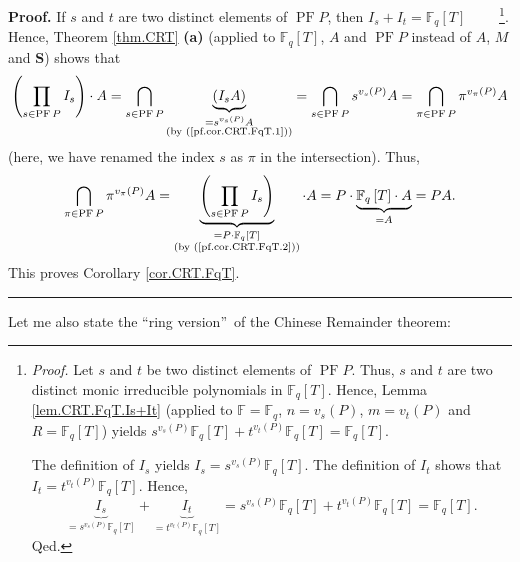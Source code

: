 \documentclass[numbers=enddot,12pt,final,onecolumn,notitlepage]{scrartcl}%
\theoremstyle{definition}
\newenvironment{proof}[1][Proof]{\noindent\textbf{#1.} }{\ \rule{0.5em}{0.5em}}
\let\prodnonlimits\prod
\renewcommand{\prod}{\prodnonlimits\limits}
\begin{document}
\begin{proof}
If $s$ and $t$ are two distinct elements of $\operatorname*{PF}P$, then
$I_{s}+I_{t}=\mathbb{F}_{q}\left[  T\right]  $%
\ \ \ \ \footnote{\textit{Proof.} Let $s$ and $t$ be two distinct elements of
$\operatorname*{PF}P$. Thus, $s$ and $t$ are two distinct monic irreducible
polynomials in $\mathbb{F}_{q}\left[  T\right]  $. Hence, Lemma
\ref{lem.CRT.FqT.Is+It} (applied to $\mathbb{F}=\mathbb{F}_{q}$,
$n=v_{s}\left(  P\right)  $, $m=v_{t}\left(  P\right)  $ and $R=\mathbb{F}%
_{q}\left[  T\right]  $) yields $s^{v_{s}\left(  P\right)  }\mathbb{F}%
_{q}\left[  T\right]  +t^{v_{t}\left(  P\right)  }\mathbb{F}_{q}\left[
T\right]  =\mathbb{F}_{q}\left[  T\right]  $.
\par
The definition of $I_{s}$ yields $I_{s}=s^{v_{s}\left(  P\right)  }%
\mathbb{F}_{q}\left[  T\right]  $. The definition of $I_{t}$ shows that
$I_{t}=t^{v_{t}\left(  P\right)  }\mathbb{F}_{q}\left[  T\right]  $. Hence,%
\[
\underbrace{I_{s}}_{=s^{v_{s}\left(  P\right)  }\mathbb{F}_{q}\left[
T\right]  }+\underbrace{I_{t}}_{=t^{v_{t}\left(  P\right)  }\mathbb{F}%
_{q}\left[  T\right]  }=s^{v_{s}\left(  P\right)  }\mathbb{F}_{q}\left[
T\right]  +t^{v_{t}\left(  P\right)  }\mathbb{F}_{q}\left[  T\right]
=\mathbb{F}_{q}\left[  T\right]  .
\]
Qed.}. Hence, Theorem \ref{thm.CRT} \textbf{(a)} (applied to $\mathbb{F}%
_{q}\left[  T\right]  $, $A$ and $\operatorname*{PF}P$ instead of $A$, $M$ and
$\mathbf{S}$) shows that%
\[
\left(  \prod\limits_{s\in\operatorname*{PF}P}I_{s}\right)  \cdot
A=\bigcap_{s\in\operatorname*{PF}P}\underbrace{\left(  I_{s}A\right)
}_{\substack{=s^{v_{s}\left(  P\right)  }A\\\text{(by (\ref{pf.cor.CRT.FqT.1}%
))}}}=\bigcap_{s\in\operatorname*{PF}P}s^{v_{s}\left(  P\right)  }%
A=\bigcap_{\pi\in\operatorname*{PF}P}\pi^{v_{\pi}\left(  P\right)  }A
\]
(here, we have renamed the index $s$ as $\pi$ in the intersection). Thus,%
\[
\bigcap_{\pi\in\operatorname*{PF}P}\pi^{v_{\pi}\left(  P\right)
}A=\underbrace{\left(  \prod\limits_{s\in\operatorname*{PF}P}I_{s}\right)
}_{\substack{=P\cdot\mathbb{F}_{q}\left[  T\right]  \\\text{(by
(\ref{pf.cor.CRT.FqT.2}))}}}\cdot A=P\cdot\underbrace{\mathbb{F}_{q}\left[
T\right]  \cdot A}_{=A}=PA.
\]
This proves Corollary \ref{cor.CRT.FqT}.
\end{proof}

Let me also state the \textquotedblleft ring version\textquotedblright\ of the
Chinese Remainder theorem:
\end{document}
